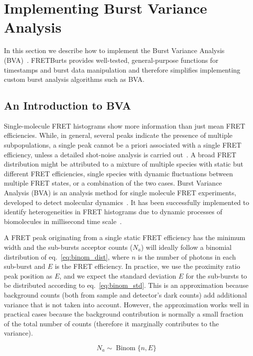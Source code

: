 \section{Implementing Burst Variance Analysis}
\label{sec:bva}
In this section we describe how to implement the Burst Variance Analysis (BVA)~\cite{Torella_2011}.
FRETBurts provides well-tested, general-purpose functions for timestamps and burst data 
manipulation and therefore simplifies implementing custom burst analysis algorithms such as BVA.

\subsection{An Introduction to BVA}
Single-molecule FRET histograms show more information than just mean FRET efficiencies. 
While, in general, several peaks indicate the presence of multiple subpopulations, 
a single peak cannot be a priori associated with a single FRET efficiency,
unless a detailed shot-noise analysis is carried out~\cite{Nir_2006,Antonik2006}.
A broad FRET distribution might be attributed to a mixture of multiple species with static but different FRET efficiencies, single species with dynamic fluctuations between multiple FRET states, or a combination of the two cases. Burst Variance Analysis (BVA) is an analysis method for single molecule FRET experiments, developed to detect molecular dynamics~\cite{Torella_2011}. It has been successfully implemented to identify heterogeneities in FRET histograms due to dynamic processes of biomolecules in millisecond time scale~\cite{Torella_2011, Robb_2013}.

A FRET peak originating from a single static FRET efficiency has the minimum width and 
the sub-bursts acceptor counts ($N_a$) will ideally follow a binomial distribution of 
eq.~\ref{eq:binom_dist}, where $n$ is the number of photons in each sub-burst and 
$E$ is the FRET efficiency. In practice, we use the proximity ratio peak position as $E$,
and we expect the standard deviation $E$ for the sub-bursts to be distributed according to 
eq.~\ref{eq:binom_std}. This is an approximation because background counts (both from
sample and detector's dark counts) add additional variance that is not taken into account.
However, the approximation works well in practical cases because the background contribution
is normally a small fraction of the total number of counts (therefore it marginally contributes to the variance).

\begin{equation}
\label{eq:binom_dist}
N_a \sim \operatorname{Binom} \{n, E\}
\end{equation}

